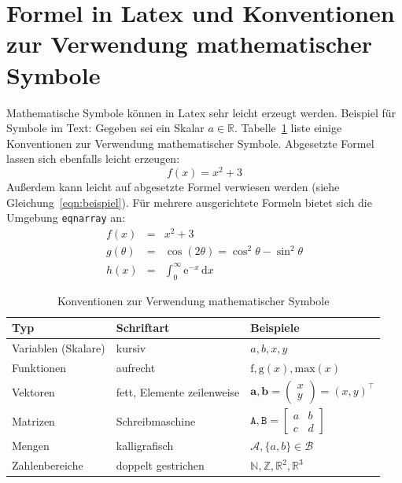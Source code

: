 \section{Formel in Latex und Konventionen zur Verwendung mathematischer Symbole}
Mathematische Symbole können in Latex sehr leicht erzeugt werden. Beispiel für Symbole im Text: Gegeben sei ein Skalar $a \in \mathbb{R}$. Tabelle~\ref{tab:mathematischeSymbole} liste einige Konventionen zur Verwendung mathematischer Symbole. Abgesetzte Formel lassen sich ebenfalls leicht erzeugen:
\begin{equation}
\label{eqn:beispiel}
f(x) = x^2 + 3
\end{equation}
Außerdem kann leicht auf abgesetzte Formel verwiesen werden (siehe Gleichung~\ref{eqn:beispiel}). Für mehrere ausgerichtete Formeln bietet sich die Umgebung \texttt{eqnarray} an:
\begin{eqnarray}
\label{eqn:beispiel2}
f(x) &=& x^2 + 3 \\
g(\theta) &=& \cos (2\theta) = \cos^2 \theta - \sin^2 \theta\\
h(x) &=& \int_0^\infty \mathrm{e}^{-x}\,\mathrm{d}x
\end{eqnarray}


\begin{table}[htbp]
\centering
\begin{tabular}{lll}
\toprule \textbf{Typ} & \textbf{Schriftart} & \textbf{Beispiele} \\
\bottomrule
Variablen (Skalare) & kursiv & $a, b, x, y$ \\
Funktionen & aufrecht& $\mathrm{f}, \mathrm{g}(x), \mathrm{max}(x)$\\
Vektoren & fett, Elemente zeilenweise & $\mathbf{a}, \mathbf{b}= \begin{pmatrix}x\\y\end{pmatrix} = (x, y)^\top$\\
Matrizen & Schreibmaschine& $\mathtt{A}, \mathtt{B}= \begin{bmatrix}a & b\\c & d\end{bmatrix}$\\
Mengen & kalligrafisch& $\mathcal{A}, \{a, b\} \in \mathcal{B}$ \\
Zahlenbereiche & doppelt gestrichen& $\mathbb{N}, \mathbb{Z}, \mathbb{R}^2, \mathbb{R}^3$ \\
\bottomrule
\end{tabular}
\caption{Konventionen zur Verwendung mathematischer Symbole}
\label{tab:mathematischeSymbole}
\end{table}






